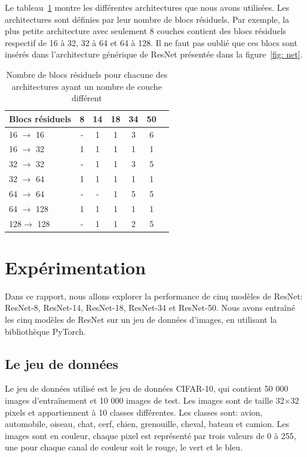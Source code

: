 \documentclass{article}
\begin{document}
Le tableau~\ref{tab:resnet} montre les différentes architectures que nous avons utilisées. Les architectures sont
définies par leur nombre de blocs résiduels. Par exemple, la plus petite architecture avec seulement 8 couches contient
des blocs résiduels respectif de 16 à 32, 32 à 64 et 64 à 128. Il ne faut pas oublié que ces blocs sont insérés dans l'architecture
générique de ResNet présentée dans la figure~\ref{fig: net}.

\begin{table}[H]
\centering
\begin{tabular}{lcccccc}
\hline
Blocs résiduels & 8 & 14 & 18 & 34 & 50 \\
\hline
16 $\rightarrow $ 16 & - & 1 & 1 & 3 & 6 \\
16 $\rightarrow $ 32 & 1 & 1 & 1 & 1 & 1 \\
32 $\rightarrow $ 32 & - & 1 & 1 & 3 & 5 \\
32 $\rightarrow $ 64 & 1 & 1 & 1 & 1 & 1 \\
64 $\rightarrow $ 64 & - & - & 1 & 5 & 5 \\
64 $\rightarrow $ 128 & 1 & 1 & 1 & 1 & 1 \\
128$\rightarrow $ 128 & - & 1 & 1 & 2 & 5 \\
\hline
\end{tabular}
\caption{Nombre de blocs résiduels pour chacune des architectures ayant un nombre de couche différent}\label{tab:resnet}
\end{table}

\section{Expérimentation}

Dans ce rapport, nous allons explorer la performance de cinq modèles de ResNet: ResNet-8, ResNet-14, ResNet-18, ResNet-34 et ResNet-50.
Nous avons entraîné les cinq modèles de ResNet sur un jeu de données d'images, en utilisant la bibliothèque PyTorch.

\subsection{Le jeu de données}

Le jeu de données utilisé est le jeu de données CIFAR-10, qui contient 50 000 images d'entraînement et 10 000 images
de test. Les images sont de taille 32$\times$32 pixels et appartiennent à 10 classes différentes. Les classes sont:
avion, automobile, oiseau, chat, cerf, chien, grenouille, cheval, bateau et camion. Les images sont en couleur,
chaque pixel est représenté par trois valeurs de 0 à 255, une pour chaque canal de couleur soit le rouge, le vert et le bleu.
\end{document}
